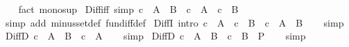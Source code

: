 \begin{isabellebody}
%
\isadelimproof
\ \ %
\endisadelimproof
%
\isatagproof
{}\isamarkupfalse%
\ {\isacharparenleft}{\kern0pt}fact\ mono{\isacharunderscore}{\kern0pt}sup{\isacharparenright}{\kern0pt}%
\endisatagproof
{\isafoldproof}%
%
\isadelimproof
%
\endisadelimproof
%
\isadelimdocument
%
\endisadelimdocument
%
\isatagdocument
%
\isamarkuptrue%
%
\endisatagdocument
{\isafolddocument}%
%
\isadelimdocument
%
\endisadelimdocument
{}\isamarkupfalse%
\ Diff{\isacharunderscore}{\kern0pt}iff\ {\isacharbrackleft}{\kern0pt}simp{\isacharbrackright}{\kern0pt}{\isacharcolon}{\kern0pt}\ {\isachardoublequoteopen}c\ {\isasymin}\ A\ {\isacharminus}{\kern0pt}\ B\ {\isasymlongleftrightarrow}\ c\ {\isasymin}\ A\ {\isasymand}\ c\ {\isasymnotin}\ B{\isachardoublequoteclose}\isanewline
%
\isadelimproof
\ \ %
\endisadelimproof
%
\isatagproof
{}\isamarkupfalse%
\ {\isacharparenleft}{\kern0pt}simp\ add{\isacharcolon}{\kern0pt}\ minus{\isacharunderscore}{\kern0pt}set{\isacharunderscore}{\kern0pt}def\ fun{\isacharunderscore}{\kern0pt}diff{\isacharunderscore}{\kern0pt}def{\isacharparenright}{\kern0pt}%
\endisatagproof
{\isafoldproof}%
%
\isadelimproof
\isanewline
%
\endisadelimproof
\isanewline
{}\isamarkupfalse%
\ DiffI\ {\isacharbrackleft}{\kern0pt}intro{\isacharbang}{\kern0pt}{\isacharbrackright}{\kern0pt}{\isacharcolon}{\kern0pt}\ {\isachardoublequoteopen}c\ {\isasymin}\ A\ {\isasymLongrightarrow}\ c\ {\isasymnotin}\ B\ {\isasymLongrightarrow}\ c\ {\isasymin}\ A\ {\isacharminus}{\kern0pt}\ B{\isachardoublequoteclose}\isanewline
%
\isadelimproof
\ \ %
\endisadelimproof
%
\isatagproof
{}\isamarkupfalse%
\ simp%
\endisatagproof
{\isafoldproof}%
%
\isadelimproof
\isanewline
%
\endisadelimproof
\isanewline
{}\isamarkupfalse%
\ DiffD{}{\isacharcolon}{\kern0pt}\ {\isachardoublequoteopen}c\ {\isasymin}\ A\ {\isacharminus}{\kern0pt}\ B\ {\isasymLongrightarrow}\ c\ {\isasymin}\ A{\isachardoublequoteclose}\isanewline
%
\isadelimproof
\ \ %
\endisadelimproof
%
\isatagproof
{}\isamarkupfalse%
\ simp%
\endisatagproof
{\isafoldproof}%
%
\isadelimproof
\isanewline
%
\endisadelimproof
\isanewline
{}\isamarkupfalse%
\ DiffD{}{\isacharcolon}{\kern0pt}\ {\isachardoublequoteopen}c\ {\isasymin}\ A\ {\isacharminus}{\kern0pt}\ B\ {\isasymLongrightarrow}\ c\ {\isasymin}\ B\ {\isasymLongrightarrow}\ P{\isachardoublequoteclose}\isanewline
%
\isadelimproof
\ \ %
\endisadelimproof
%
\isatagproof
{}\isamarkupfalse%
\ simp%
\endisatagproof

\end{isabellebody}

